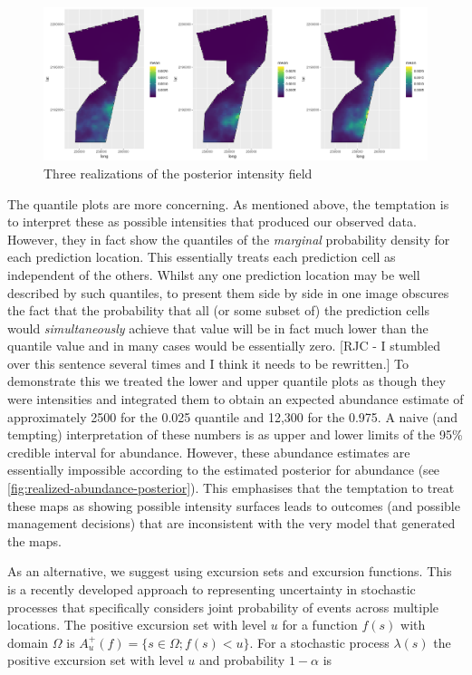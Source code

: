 \documentclass[preprint,12pt]{elsarticle}
\begin{document}
\begin{figure}
	\includegraphics[scale=0.35]{figures/intensity_realized.png}
	\caption{Three realizations of the posterior intensity field}
	\label{fig:intensity-realizations}
\end{figure}

The quantile plots are more concerning.  As mentioned above, the temptation is to interpret these as possible intensities that produced our observed data.  However, they in fact show the quantiles of the \textit{marginal} probability density for each prediction location.  This essentially treats each prediction cell as independent of the others. Whilst any one prediction location may be well described by such quantiles, to present them side by side in one image obscures the fact that the probability that all (or some subset of) the prediction cells would \textit{simultaneously} achieve that value will be in fact much lower than the quantile value and in many cases would be essentially zero.  [RJC - I stumbled over this sentence several times and I think it needs to be rewritten.]  To demonstrate this we treated the lower and upper quantile plots as though they were intensities and integrated them to obtain an expected abundance estimate of approximately 2500 for the 0.025 quantile and 12,300 for the 0.975.  A naive (and tempting) interpretation of these numbers is as upper and lower limits of the 95\% credible interval for abundance. However, these abundance estimates are essentially impossible according to the estimated posterior for abundance (see \autoref{fig:realized-abundance-posterior}).  This emphasises that the temptation to treat these maps as showing possible intensity surfaces leads to outcomes (and possible management decisions) that are inconsistent with the very model that generated the maps.

As an alternative, we suggest using excursion sets and excursion functions.  This is a recently developed approach to representing uncertainty in stochastic processes that specifically considers joint probability of events across multiple locations.  The positive excursion set with level $u$ for a function $f(s)$ with domain $\Omega$ is $A_u^{+}(f) = \{ s \in \Omega ; f(s) < u \}$.  For a stochastic process $\lambda(s)$ the positive excursion set with level $u$ and probability $1 - \alpha$ is
\end{document}
